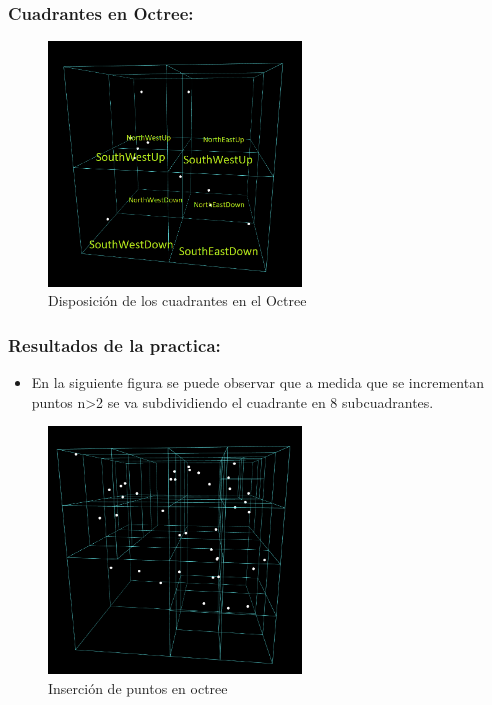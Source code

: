 \documentclass{article}
\begin{document}
\subsubsection{Cuadrantes en Octree: }

\begin{figure}[htbp]
\centering
\includegraphics[width=0.6\textwidth]{img/octree_cuadrante.png}
\caption{Disposición de los cuadrantes en el Octree}
\label{fig:octree_cuadrante}
\end{figure}

\subsubsection{Resultados de la practica: }

\begin{itemize}
\item En la siguiente figura se puede observar que a medida que se incrementan puntos n>2 se va subdividiendo el cuadrante en 8 subcuadrantes.
\end{itemize}

\begin{figure}[htbp]
\centering
\includegraphics[width=0.6\textwidth]{img/octree_insert.png}
\caption{Inserción de puntos en octree}
\label{fig:octree_insert}
\end{figure}
\end{document}
